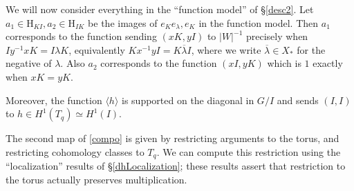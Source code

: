 \documentclass[10pt]{amsart}
\newcommand{\changecolor}{black}
\newcommand{\lambdabar}{\overline{\lambda}}
\theoremstyle{remark}
\begin{document}
 We will now consider  everything in the ``function model'' of \S \ref{desc2}. %
 Let $a_1 \in \mathrm{H}_{KI}, a_2 \in \mathrm{H}_{IK}$ be the images of $e_K e_{\lambda} , e_K$ in the function model. Then 
 $a_1$ corresponds to  the function sending $(xK, yI)$ to $|W|^{-1}$ precisely when $I y^{-1} x K= I \lambda K$, 
 equivalently $K x^{-1} y I = K \lambdabar I$, where we write $\lambdabar \in X_*$ for the negative of $\lambda$.
 Also $a_2$ 
 corresponds to  the function $(xI, yK)$ which is $1$ exactly when $xK = yK$.   

 Moreover, the function $\langle h \rangle$ is supported on the diagonal in $G/I$ and sends $(I, I)$ to $h \in H^1(T_q) \simeq H^1(I)$. 
  
 The second map of \eqref{compo} is  given by restricting arguments to the torus,
 and restricting cohomology classes to $T_q$. 
   We can compute this restriction using the ``localization'' results of \S \ref{dhLocalization};
   these results assert that  restriction to the torus actually preserves multiplication. 
   
\end{document}
